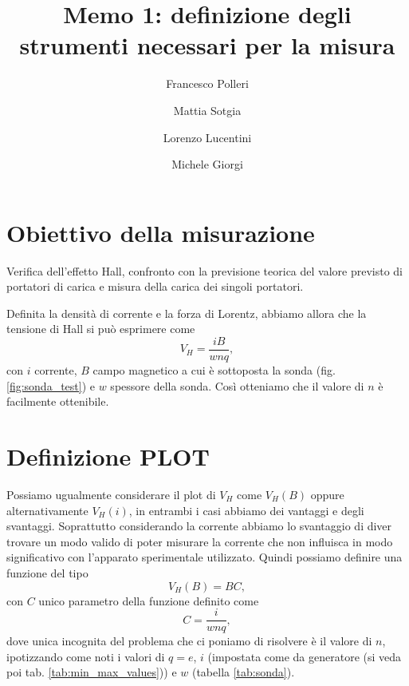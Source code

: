 \documentclass[fleqn,varvw,11pt,tightenlines]{memo}
\begin{document}
\title{Memo 1: definizione degli strumenti necessari per la misura}

\author{Francesco Polleri}
\author{Mattia Sotgia}


\author{Lorenzo Lucentini}
\author{Michele Giorgi}

\revised{\today}

\begin{abstract}

\end{abstract}
\maketitle

\section{Obiettivo della misurazione}

Verifica dell'effetto Hall, confronto con la previsione teorica del valore previsto di portatori di carica e misura della carica dei singoli portatori.

Definita la densità di corrente e la forza di Lorentz, abbiamo allora che la tensione di Hall si può esprimere come \begin{equation}
    V_H = \frac{iB}{wnq},\label{eq:V_H_full}
\end{equation} con $i$ corrente, $B$ campo magnetico a cui è sottoposta la sonda (fig. \ref{fig:sonda_test}) e $w$ spessore della sonda. Così otteniamo che il valore di $n$ è facilmente ottenibile. 



\section{Definizione PLOT}

Possiamo ugualmente considerare il plot di $V_H$ come $V_H(B)$ oppure alternativamente $V_H(i)$, in entrambi i casi abbiamo dei vantaggi e degli svantaggi. Soprattutto considerando la corrente abbiamo lo svantaggio di diver trovare un modo valido di poter misurare la corrente che non influisca in modo significativo con l'apparato sperimentale utilizzato. 
Quindi possiamo definire una funzione del tipo \begin{equation}
    V_H(B) = BC,
\end{equation} con $C$ unico parametro della funzione definito come \begin{equation}
    C=\frac{i}{wnq},
\end{equation} dove unica incognita del problema che ci poniamo di risolvere è il valore di $n$, ipotizzando come noti i valori di $q=e$, $i$ (impostata come da generatore (si veda poi tab. \ref{tab:min_max_values})) e $w$ (tabella \ref{tab:sonda}).
\end{document}
